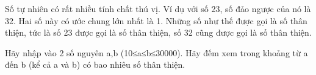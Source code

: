Số tự nhiên có rất nhiều tính chất thú vị. Ví dụ với số 23, số đảo ngược của nó là 32. Hai số này có ước chung lớn nhất là 1. Những số như thế được gọi là số thân thiện, tức là số 23 được gọi là số thân thiện, số 32 cũng được gọi là số thân thiện.  

   Hãy nhập vào 2 số nguyên a,b (10≤a≤b≤30000). Hãy đếm xem trong khoảng từ a đến b (kể  cả a và b) có bao nhiêu số thân thiện.